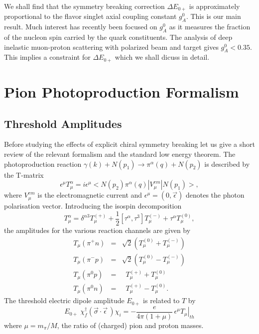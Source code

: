 We shall find that the symmetry breaking correction $\Delta E_{0+}$ is
approximately proportional to the flavor singlet axial coupling constant
$g_A^0$. This is our main result. Much interest has recently been focused 
on $g_A^0$ as it measures the fraction of the nucleon spin carried
by the  quark constituents. The analysis of deep inelastic muon-proton
scattering with polarized beam and target \cite{EMC} gives $g_A^0 < 0.35$.
This implies a constraint for $\Delta E_{0+}$ which we shall dicuss
in detail.


\section{Pion Photoproduction Formalism}
\subsection{Threshold Amplitudes}
Before studying the effects of explicit chiral symmetry breaking let us give 
a short review of the relevant formalism and the standard low energy
theorem. The photoproduction reaction $\gamma(k)+N(p_1)\to\pi^{\alpha}(q)+
N(p_2)$ is described by the T-matrix
\begin{equation}
\label{Tmat}
\epsilon^{\mu}T_{\mu}^{\alpha}= i\epsilon^{\mu}
<N(p_2)\pi^{\alpha}(q)|V^{em}_{\mu}|N(p_1)> ,
\end{equation}
where $V_{\mu}^{em}$ is the electromagnetic current and $\epsilon^{\mu}=(0,\vec
{\epsilon})$ denotes the photon polarisation vector. Introducing the isospin 
decomposition
\begin{equation}
 T_{\mu}^{\alpha}=\delta^{\alpha 3}T_{\mu}^{(+)}
+\frac{1}{2} [\tau^{\alpha},\tau^3 ] T^{(-)}_{\mu} +
 \tau^{\alpha}T^{(0)}_{\mu} ,
\end{equation} 
the amplitudes for the various reaction channels are given by
\newcommand{\alpheqn}{\setcounter{saveeqn}{\value{equation}}%
\setcounter{equation}{0}%
\renewcommand{\theequation}{\mbox{\arabic{saveeqn}-\alph{equation}}}}
\newcommand{\reseteqn}{\setcounter{equation}{\value{saveeqn}}%
\renewcommand{\theequation}{\arabic{equation}}}
\alpheqn
\begin{eqnarray}
T_{\mu}(\pi^+ n) &=& \sqrt{2} (T_{\mu}^{(0)}+T_{\mu}^{(-)} ) \\
T_{\mu}(\pi^- p) &=& \sqrt{2} (T_{\mu}^{(0)}-T_{\mu}^{(-)} ) \\
T_{\mu}(\pi^0 p) &=& \;\;      T_{\mu}^{(+)}+T_{\mu}^{(0)}   \\
T_{\mu}(\pi^0 n) &=& \;\;      T_{\mu}^{(+)}-T_{\mu}^{(0)} .
\end{eqnarray}
\reseteqn
The threshold electric dipole amplitude $E_{0+}$ is related to $T$
by
\begin{equation}
 E_{0+} \; \chi_f^\dagger (\vec{\sigma}\cdot\vec{\epsilon}\,)\chi_i
  =- \frac{e}{4\pi(1+\mu)}\left. \, \epsilon^\mu T_\mu \right|_{th}
\end{equation}
where $\mu=m_\pi/M$, the ratio of (charged) pion and proton masses.

